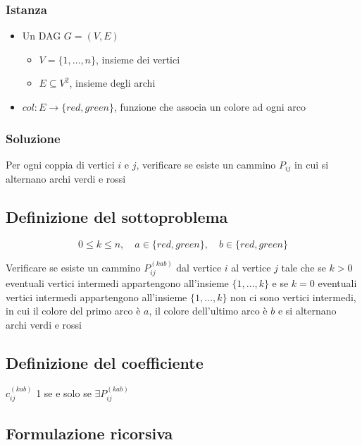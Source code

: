 \subsubsection{Istanza}
\begin{itemize}
    \item Un DAG $G=(V,E)$
    \begin{itemize}
        \item $V = \{1, \dots, n\}$, insieme dei vertici
        \item $E \subseteq V^2$, insieme degli archi
    \end{itemize}

    \item $col: E \to \{red, green\}$, funzione che associa un colore ad ogni arco
\end{itemize}

\subsubsection{Soluzione}
Per ogni coppia di vertici $i$ e $j$, verificare se esiste un cammino $P_{ij}$ in cui si alternano archi verdi e rossi

\subsection{Definizione del sottoproblema}
{
    \large
    $$
        0 \leq k \leq n, \quad a \in \{red, green\}, \quad b \in \{red, green\}
    $$
}

Verificare se esiste un cammino $P_{ij}^{(kab)}$ dal vertice $i$ al vertice $j$ tale che se $k>0$ eventuali vertici intermedi appartengono all'insieme $\{1, \dots, k\}$ e se $k=0$ eventuali vertici intermedi appartengono all'insieme $\{1, \dots, k\}$ non ci sono vertici intermedi, in cui il colore del primo arco è $a$, il colore dell'ultimo arco è $b$ e si alternano archi verdi e rossi

\subsection{Definizione del coefficiente}
$c_{ij}^{(kab)}$ 1 se e solo se $\exists P_{ij}^{(kab)}$

\subsection{Formulazione ricorsiva}

